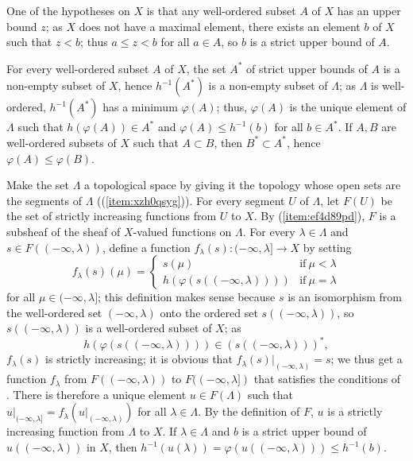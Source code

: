 \documentclass{article}
\begin{document}
\begin{solution}[\ref{exe:k8tmok20}]
  \label{sol:zipx00sf}
  One of the hypotheses on \(X\) is that any well-ordered subset \(A\)
  of \(X\) has an upper bound \(z\); as \(X\) does not have a maximal
  element, there exists an element \(b\) of \(X\) such that \(z < b\);
  thus \(a \leq z < b\) for all \(a \in A\), so \(b\) is a strict
  upper bound of \(A\).

  For every well-ordered subset \(A\) of \(X\), the set \(A^*\) of
  strict upper bounds of \(A\) is a non-empty subset of \(X\), hence
  \(h^{-1}(A^*)\) is a non-empty subset of \(\Lambda\); as \(\Lambda\)
  is well-ordered, \(h^{-1}(A^*)\) has a minimum \(\varphi(A)\); thus,
  \(\varphi(A)\) is the unique element of \(\Lambda\) such that
  \(h(\varphi(A)) \in A^*\) and \(\varphi(A) \leq h^{-1}(b)\) for all
  \(b \in A^*\).  If \(A,B\) are well-ordered subsets of \(X\) such
  that \(A \subset B\), then \(B^* \subset A^*\), hence
  \(\varphi(A) \leq \varphi(B)\).

  Make the set \(\Lambda\) a topological space by giving it the
  topology whose open sets are the segments of \(\Lambda\)
  ((\ref{item:xzh0qsyg})).  For every segment \(U\)
  of \(\Lambda\), let \(F(U)\) be the set of strictly increasing
  functions from \(U\) to \(X\).  By
  (\ref{item:ef4d89pd}), \(F\) is a subsheaf of the
  sheaf of \(X\)-valued functions on \(\Lambda\).  For every
  \(\lambda \in \Lambda\) and \(s \in F((-\infty, \lambda))\), define
  a function \(f_\lambda(s) : (-\infty, \lambda] \to X\) by setting
  \begin{displaymath}
    f_\lambda(s)(\mu) =
    \begin{cases}
      s(\mu) & \text{if} ~ \mu < \lambda \\
      h(\varphi(s((-\infty, \lambda)))) & \text{if} ~ \mu = \lambda
    \end{cases}
  \end{displaymath}
  for all \(\mu \in (-\infty, \lambda]\); this definition makes sense
  because \(s\) is an isomorphism from the well-ordered set
  \((-\infty, \lambda)\) onto the ordered set
  \(s((-\infty, \lambda))\), so \(s((-\infty, \lambda))\) is a
  well-ordered subset of \(X\); as
  \begin{displaymath}
    h(\varphi(s((-\infty, \lambda)))) \in (s((-\infty, \lambda)))^*,
  \end{displaymath}
  \(f_\lambda(s)\) is strictly increasing; it is obvious that
  \(f_\lambda(s) \vert_{(-\infty, \lambda)} = s\); we thus get a
  function \(f_\lambda\) from \(F((-\infty, \lambda))\) to
  \(F((-\infty, \lambda])\) that satisfies the conditions of
  .  There is therefore a unique element
  \(u \in F(\Lambda)\) such that
  \(u \vert_{(-\infty, \lambda]} = f_\lambda(u \vert_{(-\infty,
    \lambda)})\) for all \(\lambda \in \Lambda\).  By the definition
  of \(F\), \(u\) is a strictly increasing function from \(\Lambda\)
  to \(X\).  If \(\lambda \in \Lambda\) and \(b\) is a strict upper
  bound of \(u((-\infty, \lambda))\) in \(X\), then
  \(h^{-1}(u(\lambda)) = \varphi(u((-\infty, \lambda))) \leq
  h^{-1}(b)\).


\end{solution}
\end{document}
